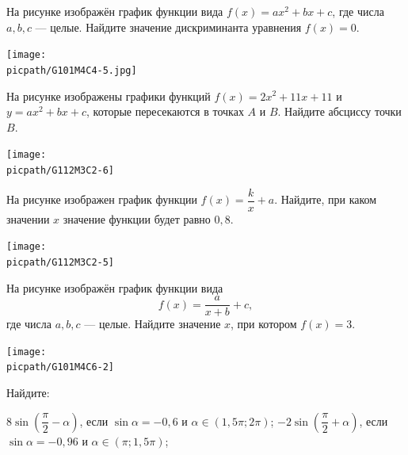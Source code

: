 \begin{class}[number=5]
\begin{listofex}
		\item
	\begin{minipage}[t]{\bodywidth}
			На рисунке изображён график функции вида \(f(x)=ax^2+bx+c\), где числа \(a, b, c\) --- целые. Найдите значение дискриминанта уравнения \(f(x)=0\).
		\end{minipage}
	\begin{minipage}[t]{\picwidth}
			\texttt{[image: \\picpath/G101M4C4-5.jpg]}
		\end{minipage}
		
		\item
		\begin{minipage}[t]{\bodywidth}
			На рисунке изображены графики функций \( f(x)=2x^2+11x+11 \) и \( y=ax^2+bx+c \), которые пересекаются в точках \( A \) и \( B \). Найдите абсциссу точки \( B \).
		\end{minipage}
		\begin{minipage}[t]{\picwidth}
			\texttt{[image: \\picpath/G112M3C2-6]}
		\end{minipage}
			\item
		\begin{minipage}[t]{\bodywidth}
			На рисунке изображен график функции \( f(x)=\dfrac{k}{x}+a \). Найдите, при каком значении \( x \) значение функции будет равно \( 0,8 \).
		\end{minipage}
		\begin{minipage}[t]{\picwidth}
			\texttt{[image: \\picpath/G112M3C2-5]}
		\end{minipage}
		\item
		\begin{minipage}[t]{\bodywidth}
			На рисунке изображён график функции вида \[ f(x)=\dfrac{a}{x+b}+c, \] где числа \(a, b, c\) --- целые. Найдите значение \(x\), при котором \(f(x)=3\).
		\end{minipage}
		\hspace{0.02\linewidth}
		\begin{minipage}[t]{\picwidth}
			\texttt{[image: \\picpath/G101M4C6-2]}
		\end{minipage}
		\newpage
		\item Найдите:
		\begin{tasks}
			\task \( 8 \sin \left( \dfrac{ \pi }{ 2 }- \alpha \right) \), если \( \sin \alpha = -0,6 \) и \( \alpha \in (1,5\pi;2\pi) \);
			\task \( -2 \sin \left( \dfrac{ \pi }{ 2 }+\alpha \right) \), если \( \sin \alpha = -0,96 \) и \( \alpha \in (\pi;1,5\pi) \);

\end{tasks}
\end{listofex}
\end{class}
